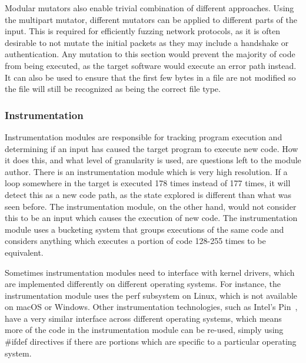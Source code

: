 Modular mutators also enable trivial combination of different approaches. Using
the multipart mutator, different mutators can be applied to different parts of
the input. This is required for efficiently fuzzing network protocols, as it is
often desirable to not mutate the initial packets as they may include a handshake or
authentication.  Any mutation to this section would prevent the majority of code from being
executed, as the target software would execute an error path instead. It can
also be used to ensure that the first few bytes in a file are not modified so
the file will still be recognized as being the correct file type.


\subsubsection{Instrumentation} \label{Instrumentation Overview}
Instrumentation modules are responsible for tracking program execution and
determining if an input has caused the target program to execute new code. How it does this,
and what level of granularity is used, are questions left to the module author.
There is an \IPT{} instrumentation module which is very high resolution.
If a loop somewhere in the target is executed 178 times instead of 177
times, it will detect this as a new code path, as the state explored is
different than what was seen before.  The \AFL{} instrumentation module, on the
other hand, would not consider this to be an input which causes the execution of new code.
The \AFL{} instrumentation module uses a bucketing system that groups executions of the same
code and considers anything which executes a portion of code 128-255 times to
be equivalent.\cite{aflbucketing}

Sometimes instrumentation modules need to interface with kernel drivers, which are
implemented differently on different operating systems. For instance, the \IPT{}
instrumentation module uses the perf subsystem on Linux, which is not available
on macOS or Windows. Other instrumentation technologies, such as Intel's
Pin~\cite{pin}, have a very similar interface across different operating
systems, which means more of the code in the instrumentation module can be
re-used, simply using \#ifdef directives if there are portions which are
specific to a particular operating system.
